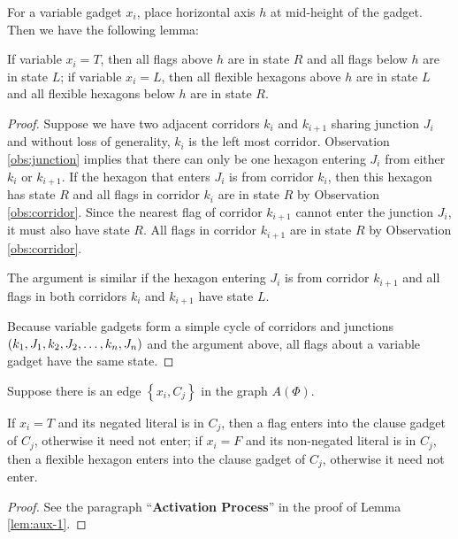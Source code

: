 For a variable gadget $x_i$, place horizontal axis $h$ at mid-height of the gadget.
Then we have the following lemma:
\begin{lem}\label{lem:aux-2}
If variable $x_i = T$, then all flags above $h$ are in state $R$ and all flags below $h$ are in state $L$; if variable $x_i = L$, then all flexible hexagons above $h$ are in state $L$ and all flexible hexagons below $h$ are in state $R$.    
\end{lem}
\begin{proof}
Suppose we have two adjacent corridors $k_i$ and $k_{i+1}$ sharing junction $J_i$ and without loss of generality, $k_i$ is the left most corridor.
Observation \ref{obs:junction} implies that there can only be one hexagon entering $J_i$ from either $k_i$ or $k_{i+1}$. If the hexagon that enters $J_i$ is from corridor $k_i$, then this hexagon has state $R$ and all flags in corridor $k_i$ are in state $R$ by Observation \ref{obs:corridor}. 
Since the nearest flag of corridor $k_{i+1}$ cannot enter the junction $J_i$, it must also have state $R$.  
All flags in corridor $k_{i+1}$ are in state $R$ by Observation \ref{obs:corridor}. 

The argument is similar if the hexagon entering $J_i$ is from corridor $k_{i+1}$ and all flags in both corridors $k_i$ and $k_{i+1}$ have state $L$.

Because variable gadgets form a simple cycle of corridors and junctions $\left( k_1, J_1, k_2, J_2, \dots, k_n, J_n \right)$ and the argument above, all flags about a variable gadget have the same state.
\end{proof}
Suppose there is an edge $\left\lbrace x_i, C_j \right\rbrace$ in the graph $A(\Phi)$.
\begin{lem}\label{lem:aux-3}
If $x_i = T$ and its negated literal is in $C_j$, then a flag enters into the clause gadget of $C_j$, otherwise it need not enter; if $x_i = F$ and its non-negated literal is in $C_j$, then a flexible hexagon enters into the clause gadget of $C_j$, otherwise it need not enter.
\end{lem}
\begin{proof}
See the paragraph ``\textbf{Activation Process}'' in the proof of Lemma \ref{lem:aux-1}.
\end{proof}

